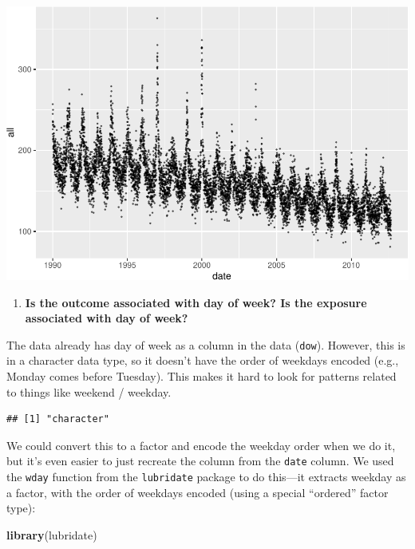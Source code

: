 \documentclass[
]{book}
\newenvironment{Shaded}{\begin{snugshade}}{\end{snugshade}}
\newcommand{\KeywordTok}[1]{\textcolor[rgb]{0.13,0.29,0.53}{\textbf{#1}}}
\newcommand{\NormalTok}[1]{#1}
\newcommand{\OperatorTok}[1]{\textcolor[rgb]{0.81,0.36,0.00}{\textbf{#1}}}
\providecommand{\tightlist}{%
  \setlength{\itemsep}{0pt}\setlength{\parskip}{0pt}}
\begin{document}
\includegraphics{adv_epi_analysis_files/figure-latex/unnamed-chunk-14-1.pdf}

\begin{enumerate}
\def\labelenumi{\arabic{enumi}.}
\setcounter{enumi}{4}
\tightlist
\item
  \textbf{Is the outcome associated with day of week? Is the exposure associated
  with day of week?}
\end{enumerate}

The data already has day of week as a column in the data (\texttt{dow}). However,
this is in a character data type, so it doesn't have the order of weekdays
encoded (e.g., Monday comes before Tuesday). This makes it hard to look for
patterns related to things like weekend / weekday.

\begin{Shaded}
\end{Shaded}

\begin{verbatim}
## [1] "character"
\end{verbatim}

We could convert this to a factor and encode the weekday order when we do
it, but it's even easier to just recreate the column from the \texttt{date} column.
We used the \texttt{wday} function from the \texttt{lubridate} package to do this---it extracts
weekday as a factor, with the order of weekdays encoded (using a special
``ordered'' factor type):

\begin{Shaded}
\begin{Highlighting}[]
\KeywordTok{library}\NormalTok{(lubridate)}
\end{Highlighting}
\end{Shaded}
\end{document}
